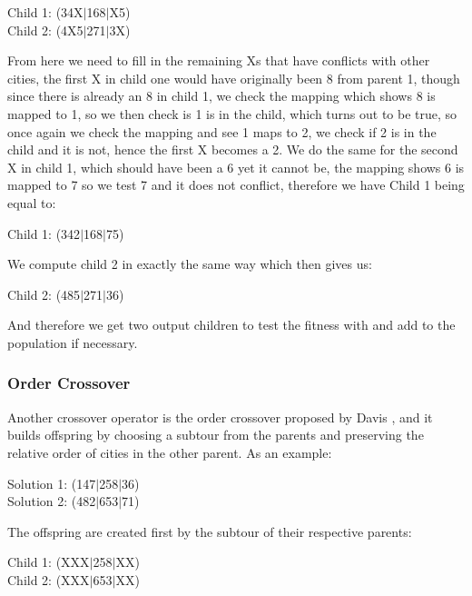 \documentclass[11pt,a4paper,titlepage]{article}
\begin{document}
\begin{center}\Large
Child 1: (34X$|$168$|$X5)\\
Child 2: (4X5$|$271$|$3X)
\end{center}

From here we need to fill in the remaining Xs that have conflicts with other cities, the first X in child one would have originally been 8 from parent 1, though since there is already an 8 in child 1, we check the mapping which shows 8 is mapped to 1, so we then check is 1 is in the child, which turns out to be true, so once again we check the mapping and see 1 maps to 2, we check if 2 is in the child and it is not, hence the first X becomes a 2. We do the same for the second X in child 1, which should have been a 6 yet it cannot be, the mapping shows 6 is mapped to 7 so we test 7 and it does not conflict, therefore we have Child 1 being equal to:

\begin{center}\Large
Child 1: (342$|$168$|$75)
\end{center}

We compute child 2 in exactly the same way which then gives us:

\begin{center}\Large
Child 2: (485$|$271$|$36)
\end{center}

And therefore we get two output children to test the fitness with and add to the population if necessary.

\subsubsection{Order Crossover}

Another crossover operator is the order crossover proposed by Davis \cite{GACrossover}, and it builds offspring by choosing a subtour from the parents and preserving the relative order of cities in the other parent. As an example:

\begin{center}\Large
Solution 1: (147$|$258$|$36)\\
Solution 2: (482$|$653$|$71)
\end{center}

The offspring are created first by the subtour of their respective parents:

\begin{center}\Large
Child 1: (XXX$|$258$|$XX)\\
Child 2: (XXX$|$653$|$XX)
\end{center}
\end{document}
